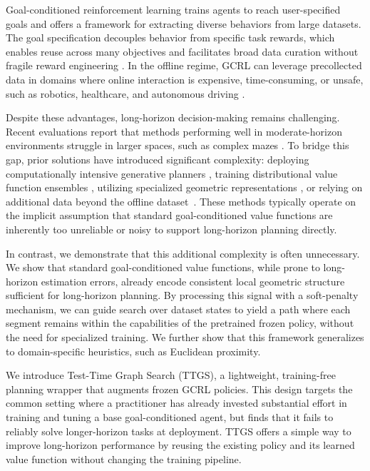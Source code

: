 \documentclass{article} %
\begin{document}
Goal-conditioned reinforcement learning trains agents to reach user-specified goals and offers a framework for extracting diverse behaviors from large datasets. The goal specification decouples behavior from specific task rewards, which enables reuse across many objectives and facilitates broad data curation without fragile reward engineering \citep{Schaul2015UniversalVF, Andrychowicz2017}. In the offline regime, GCRL can leverage precollected data in domains where online interaction is expensive, time-consuming, or unsafe, such as robotics, healthcare, and autonomous driving \citep{fu2020d4rl, abdellatif2021reinforcement, kumar2020conservative}.

Despite these advantages, long-horizon decision-making remains challenging. Recent evaluations report that methods performing well in moderate-horizon environments struggle in larger spaces, such as complex mazes \citep{ogbench_park2025, sobal2025learning}. To bridge this gap, prior solutions have introduced significant complexity: deploying computationally intensive generative planners \citep{Ajay2023DecisionDiffuser, Luo2025CompDiffuser}, training distributional value function ensembles \citep{Eysenbach2019SoRB}, utilizing specialized geometric representations \citep{gas_baek2025}, or relying on additional data beyond the offline dataset~\citep{emmos2020sparsegraphical}. These methods typically operate on the implicit assumption that standard goal-conditioned value functions are inherently too unreliable or noisy to support long-horizon planning directly.

In contrast, we demonstrate that this additional complexity is often unnecessary. We show that standard goal-conditioned value functions, while prone to long-horizon estimation errors, already encode consistent local geometric structure sufficient for long-horizon planning. By processing this signal with a soft-penalty mechanism, we can guide search over dataset states to yield a path where each segment remains within the capabilities of the pretrained frozen policy, without the need for specialized training. We further show that this framework generalizes to domain-specific heuristics, such as Euclidean proximity.

We introduce Test-Time Graph Search (TTGS), a lightweight, training-free planning wrapper that augments frozen GCRL policies. This design targets the common setting where a practitioner has already invested substantial effort in training and tuning a base goal-conditioned agent, but finds that it fails to reliably solve longer-horizon tasks at deployment. TTGS offers a simple way to improve long-horizon performance by reusing the existing policy and its learned value function without changing the training pipeline.
\end{document}

